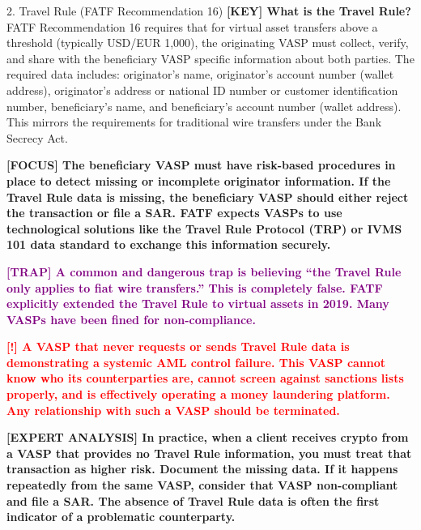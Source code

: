 \documentclass[11pt,a4paper]{beamer}
\newcommand{\redflag}[1]{\textcolor{red}{\textbf{[!] #1}}}
\newcommand{\examfocus}[1]{\textcolor{orange!80!black}{\textbf{[FOCUS] #1}}}
\newcommand{\trap}[1]{\textcolor{purple}{\textbf{[TRAP] #1}}}
\newcommand{\keyterm}[1]{\textcolor{red!80!black}{\textbf{[KEY] #1}}}
\newcommand{\expert}[1]{\textcolor{blue!70!black}{\textbf{[EXPERT ANALYSIS] #1}}}
\begin{document}
	\begin{frame}{2. Travel Rule (FATF Recommendation 16)}
		\tiny
		\keyterm{What is the Travel Rule?} FATF Recommendation 16 requires that for virtual asset transfers above a threshold (typically USD/EUR 1,000), the originating VASP must collect, verify, and share with the beneficiary VASP specific information about both parties. The required data includes: originator's name, originator's account number (wallet address), originator's address or national ID number or customer identification number, beneficiary's name, and beneficiary's account number (wallet address). This mirrors the requirements for traditional wire transfers under the Bank Secrecy Act.
		
		\vspace{0.1cm}
		\examfocus{The beneficiary VASP must have risk-based procedures in place to detect missing or incomplete originator information. If the Travel Rule data is missing, the beneficiary VASP should either reject the transaction or file a SAR. FATF expects VASPs to use technological solutions like the Travel Rule Protocol (TRP) or IVMS 101 data standard to exchange this information securely.}
		
		\vspace{0.1cm}
		\trap{A common and dangerous trap is believing “the Travel Rule only applies to fiat wire transfers.” This is completely false. FATF explicitly extended the Travel Rule to virtual assets in 2019. Many VASPs have been fined for non-compliance.}
		
		\vspace{0.1cm}
		\redflag{A VASP that never requests or sends Travel Rule data is demonstrating a systemic AML control failure. This VASP cannot know who its counterparties are, cannot screen against sanctions lists properly, and is effectively operating a money laundering platform. Any relationship with such a VASP should be terminated.}
		
		\vspace{0.1cm}
		\expert{In practice, when a client receives crypto from a VASP that provides no Travel Rule information, you must treat that transaction as higher risk. Document the missing data. If it happens repeatedly from the same VASP, consider that VASP non-compliant and file a SAR. The absence of Travel Rule data is often the first indicator of a problematic counterparty.}
	\end{frame}
	
\end{document}
